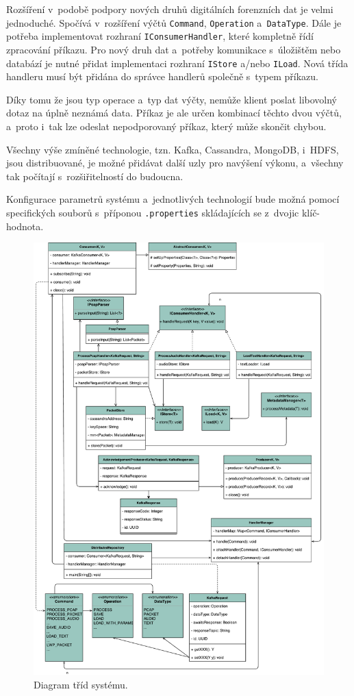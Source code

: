 Rozšíření v~podobě podpory nových druhů digitálních forenzních dat je velmi jednoduché. Spočívá v~rozšíření výčtů \texttt{Command}, \texttt{Operation} a~\texttt{DataType}. Dále je potřeba implementovat rozhraní \texttt{IConsumerHandler}, které kompletně řídí zpracování příkazu.
Pro nový druh dat a~potřeby komunikace s~úložištěm nebo databází je nutné přidat implementaci rozhraní \texttt{IStore} a/nebo \texttt{ILoad}.
Nová třída handleru musí být přidána do správce handlerů společně s~typem příkazu.

Díky tomu že jsou typ operace a~typ dat výčty, nemůže klient poslat libovolný dotaz na úplně neznámá data. Příkaz je ale určen kombinací těchto dvou výčtů, a~proto i~tak lze odeslat nepodporovaný příkaz, který může skončit chybou.

Všechny výše zmíněné technologie, tzn. Kafka, Cassandra, MongoDB, i~HDFS, jsou distribuované, je možné přidávat další uzly pro navýšení výkonu, a~všechny tak počítají s~rozšiřitelností do budoucna.

Konfigurace parametrů systému a~jednotlivých technologií bude možná pomocí specifických souborů s~příponou \texttt{.properties} skládajících se z~dvojic klíč-hodnota.

\begin{figure}[!h]
  \centering
  \includegraphics[width=15cm]{template-fig/Prototype_ClassDiagram.pdf}
  \caption{Diagram tříd systému.}
  \label{FIG_SystemArchitecture}
\end{figure}

